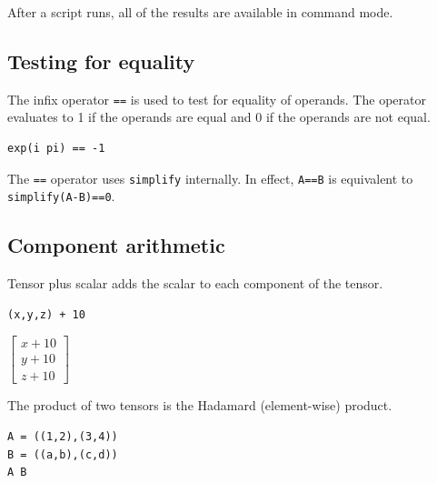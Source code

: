 \documentclass[12pt]{article}
\begin{document}
\noindent
After a script runs, all of the results are available in command mode.

\newpage





\newpage

\subsection{Testing for equality}
The infix operator \verb$==$ is used to test for equality of operands.
The operator evaluates to 1 if the operands are equal and 0 if the operands are not equal.

{\color{blue}
\begin{verbatim}
exp(i pi) == -1
\end{verbatim}
}


\bigskip
\noindent
The \verb$==$ operator uses \verb$simplify$ internally.
In effect, \verb$A==B$ is equivalent to \verb$simplify(A-B)==0$.











\subsection{Component arithmetic}

\noindent
Tensor plus scalar adds the scalar to each component of the tensor.

{\color{blue}
\begin{verbatim}
(x,y,z) + 10
\end{verbatim}
}

\noindent
$\displaystyle
\begin{bmatrix}
x+10
\\[1ex]
y+10
\\[1ex]
z+10
\end{bmatrix}
$

\bigskip
\noindent
The product of two tensors is the Hadamard (element-wise) product.

{\color{blue}
\begin{verbatim}
A = ((1,2),(3,4))
B = ((a,b),(c,d))
A B
\end{verbatim}
}
\end{document}

